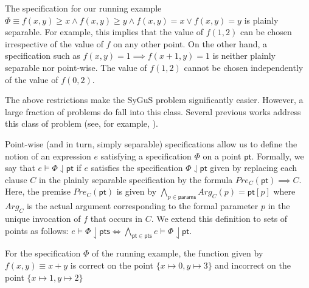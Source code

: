 \documentclass{llncs}
\newcommand\arsays[1]{{\bf AR: #1}}
\newcommand\Points{\mathsf{pts}}
\newcommand\Point{\mathsf{pt}}
\newcommand\Expr{e}
\newcommand\Spec{\Phi}
\newcommand\SynthFun{f}
\newcommand\FormalParameters{\mathsf{params}}
\newcommand{\sygus}{{\sffamily\fontsize{8.5}{10}\selectfont
    SyGuS}\xspace}
\begin{document}
\vspace*{-3mm}
\begin{example}
  The specification for our running example $\Spec \equiv \SynthFun(x,
  y) \geq x \wedge \SynthFun(x, y) \geq y \wedge \SynthFun(x, y) = x
  \vee \SynthFun(x, y) = y$ is plainly separable.
  For example, this implies that the value of $\SynthFun(1, 2)$ can be
  chosen irrespective of the value of $\SynthFun$ on any other point.
  On the other hand, a specification such as $\SynthFun(x, y) = 1
  \implies \SynthFun(x + 1, y) = 1$ is neither plainly separable nor
  point-wise.
  The value of $\SynthFun(1, 2)$ cannot be chosen independently of the
  value of $\SynthFun(0, 2)$.
\end{example}

The above restrictions make the \sygus problem significantly easier.
However, a large fraction of problems do fall into this class.
Several previous works address this class of problem (see, for
example, \cite{alur-15,madhusudan-16-pw,reynolds-15}).


Point-wise (and in turn, simply separable) specifications allow us to
define the notion of an expression $\Expr$ satisfying a specification
$\Spec$ on a point $\Point$.
Formally, we say that $\Expr \models \Spec \downharpoonleft
\Point$ if $\Expr$ satisfies the specification $\Spec \downharpoonleft
\Point$ given by replacing each clause $C$ in the plainly separable
specification by the formula $\mathit{Pre}_C(\Point) \implies C$.
Here, the premise $\mathit{Pre}_C(\Point)$ is given by $\bigwedge_{p \in
\FormalParameters} \mathit{Arg}_C(p) = \Point[p]$ where $\mathit{Arg}_C$ is the
actual argument corresponding to the formal parameter $p$ in the
unique invocation of $\SynthFun$ that occurs in $C$.
We extend this definition to sets of points as follows: $\Expr \models
\Spec \downharpoonleft \Points \Leftrightarrow \bigwedge_{\Point \in
\Points} \Expr \models \Spec\downharpoonleft\Point$.

\vspace*{-3mm}
\begin{example}
  \label{ex:running:correctness_on_point}
  For the specification $\Spec$ of the running example, the function
  given by $\SynthFun(x, y) \equiv x + y$ is correct on the point $\{ x
      \mapsto 0, y \mapsto 3 \}$ and incorrect on the point $\{ x
  \mapsto 1, y \mapsto 2 \}$
\end{example}
\end{document}
